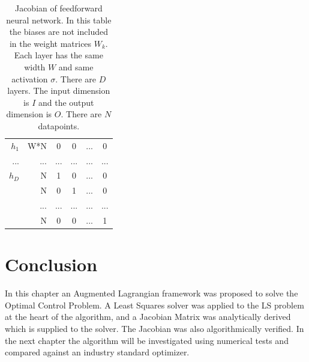 \begin{table}[p]
\begin{subtable}{\textwidth}
{\begin{tabular}{ r r | c c c c }
$h_1$ & W*N & 0 & 0 &...& 0 \\
...   & ... &...&...&...&...\\\hline
$h_D$ & N & 1 & 0 &...& 0 \\
      & N & 0 & 1 &...& 0  \\
      &...&...&...&...&...\\ 
      & N & 0 & 0 &...& 1  \\ \hline
\end{tabular}}
\end{subtable}
\caption{Jacobian of feedforward neural network. In this table the biases are not included in the weight matrices $W_k$. Each layer has the same width $W$ and same activation $\sigma$. There are $D$ layers. The input dimension is $I$ and the output dimension is $O$. There are $N$ datapoints.}
\label{jac-tab}

\end{table}
\section{Conclusion}
In this chapter an Augmented Lagrangian framework was proposed to solve the Optimal Control Problem. A Least Squares solver was applied to the LS problem at the heart of the algorithm, and a Jacobian Matrix was analytically derived which is supplied to the solver. The Jacobian was also algorithmically verified. In the next chapter the algorithm will be investigated using numerical tests and compared against an industry standard optimizer.




